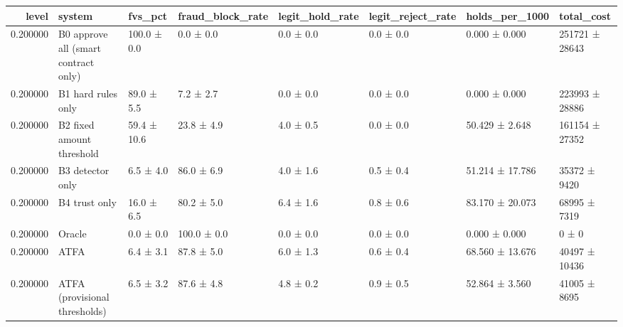 \begin{tabular}{rlllllll}
\toprule
level & system & fvs\_pct & fraud\_block\_rate & legit\_hold\_rate & legit\_reject\_rate & holds\_per\_1000 & total\_cost \\
\midrule
0.200000 & B0 approve all (smart contract only) & 100.0 ± 0.0 & 0.0 ± 0.0 & 0.0 ± 0.0 & 0.0 ± 0.0 & 0.000 ± 0.000 & 251721 ± 28643 \\
0.200000 & B1 hard rules only & 89.0 ± 5.5 & 7.2 ± 2.7 & 0.0 ± 0.0 & 0.0 ± 0.0 & 0.000 ± 0.000 & 223993 ± 28886 \\
0.200000 & B2 fixed amount threshold & 59.4 ± 10.6 & 23.8 ± 4.9 & 4.0 ± 0.5 & 0.0 ± 0.0 & 50.429 ± 2.648 & 161154 ± 27352 \\
0.200000 & B3 detector only & 6.5 ± 4.0 & 86.0 ± 6.9 & 4.0 ± 1.6 & 0.5 ± 0.4 & 51.214 ± 17.786 & 35372 ± 9420 \\
0.200000 & B4 trust only & 16.0 ± 6.5 & 80.2 ± 5.0 & 6.4 ± 1.6 & 0.8 ± 0.6 & 83.170 ± 20.073 & 68995 ± 7319 \\
0.200000 & Oracle & 0.0 ± 0.0 & 100.0 ± 0.0 & 0.0 ± 0.0 & 0.0 ± 0.0 & 0.000 ± 0.000 & 0 ± 0 \\
0.200000 & ATFA & 6.4 ± 3.1 & 87.8 ± 5.0 & 6.0 ± 1.3 & 0.6 ± 0.4 & 68.560 ± 13.676 & 40497 ± 10436 \\
0.200000 & ATFA (provisional thresholds) & 6.5 ± 3.2 & 87.6 ± 4.8 & 4.8 ± 0.2 & 0.9 ± 0.5 & 52.864 ± 3.560 & 41005 ± 8695 \\
\bottomrule
\end{tabular}
